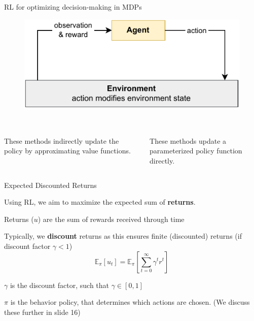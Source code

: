 \begin{frame}{RL for optimizing decision-making in MDPs}

    \begin{figure}
        \centering
        \includegraphics[width=\textwidth,height=.5\textheight,keepaspectratio]{images/chapter_2/RL-loop.pdf}
        \label{fig:rl_loop}
    \end{figure}
    \vspace{20pt}
    \begin{columns}
    
        \begin{column}{0.5\textwidth}
             \\
            These methods indirectly update the policy by approximating value functions.
        \end{column}

        \begin{column}{0.4\textwidth}
             \\
            These methods update a parameterized policy function directly.
      \end{column}
    
    \end{columns}
    
\end{frame}

\begin{frame}{Expected Discounted Returns}

    Using RL, we aim to maximize the expected sum of \textbf{returns}.

    \blist
        \item Returns ($u$) are the sum of rewards received through time
        \item Typically, we \textbf{discount} returns as this ensures finite (discounted) returns (if discount factor $\gamma < 1$)
    \elist
    \vspace{0pt}
    $$
    \mathbb{E}_{\pi}[u_{t}] = \mathbb{E}_{\pi}\left[\sum_{t=0}^{\infty}\gamma^t r^t\right]
    $$

    \blist
        \item $\gamma$ is the discount factor, such that $\gamma \in [0, 1]$
        \item $\pi$ is the behavior policy, that determines which actions are chosen. (We discuss these further in slide 16)
    \elist
\end{frame}

